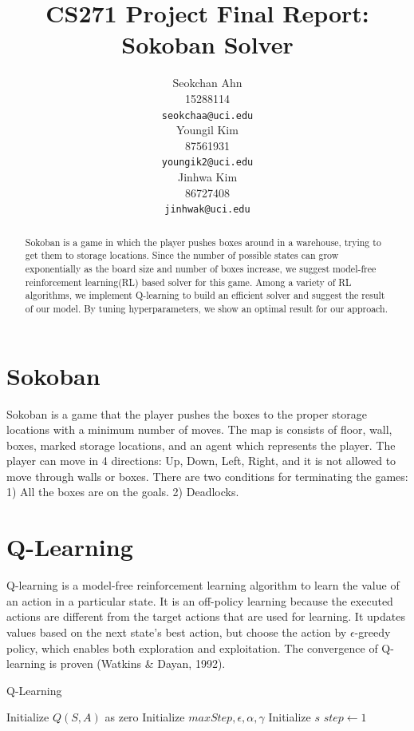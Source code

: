 \documentclass{article}
\title{CS271 Project Final Report: Sokoban Solver}
\author{
  Seokchan Ahn\\
  15288114 \\
  \texttt{seokchaa@uci.edu} \\
   \And
  Youngil Kim\\
  87561931\\
  \texttt{youngik2@uci.edu}\\
   \And
  Jinhwa Kim \\
  86727408 \\
  \texttt{jinhwak@uci.edu}
}
\begin{document}
\maketitle

\begin{abstract}
  Sokoban is a game in which the player pushes boxes around in a warehouse, trying to get them to storage locations. Since the number of possible states can grow exponentially as the board size and number of boxes increase, we suggest model-free reinforcement learning(RL) based solver for this game. Among a variety of RL algorithms, we implement Q-learning to build an efficient solver and suggest the result of our model. By tuning hyperparameters, we show an optimal result for our approach.
\end{abstract}

\section{Sokoban}
Sokoban is a game that the player pushes the boxes to the proper storage locations with a minimum number of moves. The map is consists of floor, wall, boxes, marked storage locations, and an agent which represents the player. The player can move in 4 directions: Up, Down, Left, Right, and it is not allowed to move through walls or boxes. There are two conditions for terminating the games: 1) All the boxes are on the goals. 2) Deadlocks.

\section{Q-Learning}

Q-learning is a model-free reinforcement learning algorithm to learn the value of an action in a particular state. It is an off-policy learning because the executed actions are different from the target actions that are used for learning. It updates values based on the next state's best action, but choose the action by $\epsilon$-greedy policy, which enables both exploration and exploitation. The convergence of Q-learning is proven (Watkins \& Dayan, 1992).

\begin{algorithm}[H]
\caption{Q-Learning}\label{alg:one}
Initialize $Q(S, A)$ as zero\;
Initialize $maxStep, \epsilon, \alpha, \gamma$\;
Initialize $s$ 
$step \gets 1$\;

\end{algorithm}
\end{document}
